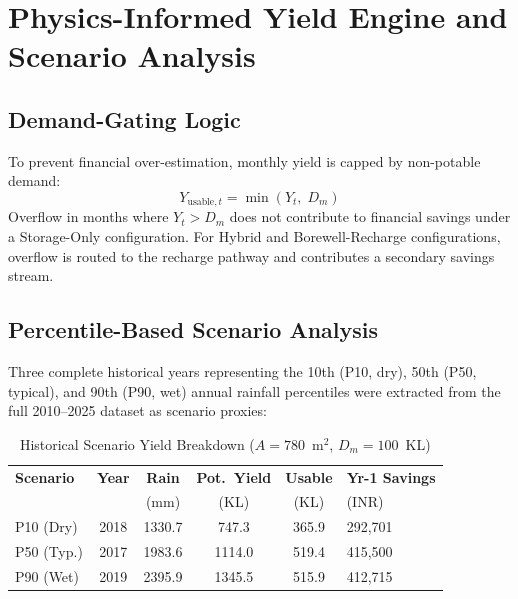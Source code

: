 \documentclass[conference]{IEEEtran}
\begin{document}
\section{Physics-Informed Yield Engine and Scenario Analysis}
\label{sec:yield}

\subsection{Demand-Gating Logic}
\label{sec:gating}

To prevent financial over-estimation, monthly yield is capped by
non-potable demand:
\begin{equation}
  Y_{\text{usable},t} = \min(Y_t,\; D_m)
  \label{eq:gating}
\end{equation}
Overflow in months where $Y_t > D_m$ does not contribute to financial savings
under a Storage-Only configuration. For Hybrid and Borewell-Recharge
configurations, overflow is routed to the recharge pathway and contributes
a secondary savings stream.

\subsection{Percentile-Based Scenario Analysis}

Three complete historical years representing the 10th (P10, dry), 50th
(P50, typical), and 90th (P90, wet) annual rainfall percentiles were
extracted from the full 2010--2025 dataset as scenario proxies:

\begin{table}[htbp]
\caption{Historical Scenario Yield Breakdown ($A = 780$~m$^2$, $D_m = 100$~KL)}
\begin{center}
\begin{tabular}{lccccl}
\toprule
\textbf{Scenario} & \textbf{Year} & \textbf{Rain} & \textbf{Pot.\ Yield}
  & \textbf{Usable} & \textbf{Yr-1 Savings} \\
 & & (mm) & (KL) & (KL) & (INR) \\
\midrule
P10 (Dry)   & 2018 & 1330.7 & 747.3  & 365.9 & 292{,}701 \\
P50 (Typ.)  & 2017 & 1983.6 & 1114.0 & 519.4 & 415{,}500 \\
P90 (Wet)   & 2019 & 2395.9 & 1345.5 & 515.9 & 412{,}715 \\
\bottomrule
\end{tabular}
\label{tab:scenarios}
\end{center}
\end{table}
\end{document}
